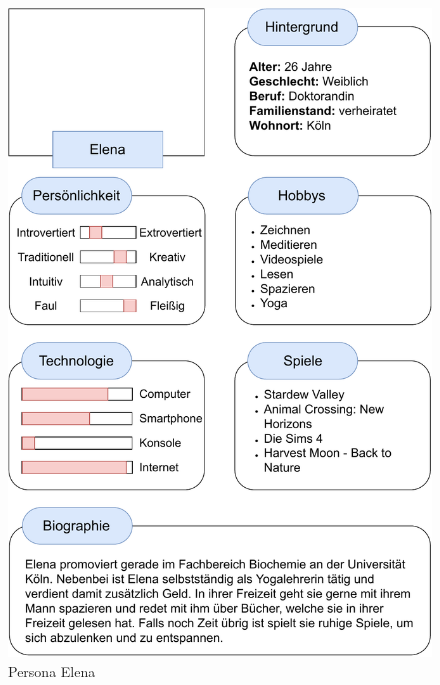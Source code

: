 \begin{figure}[H]
  \centering
  \includegraphics[width=0.83\columnwidth]{figures/Persona2.pdf}
  \caption{\label{fig:Persona2} Persona Elena}
\end{figure}
